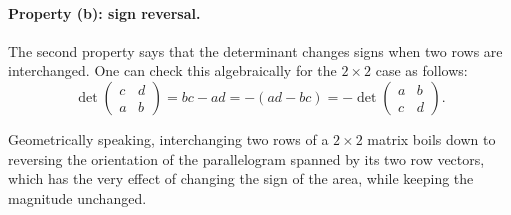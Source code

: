 \documentclass{ximera}
\begin{document}
\begin{image}[0.5\textwidth]
\end{image}


\paragraph{Property (b): sign reversal.}
The second property says that the determinant changes signs when two
rows are interchanged. One can check this algebraically for the
$2 \times 2$ case as follows:
\[
  \det
  \begin{pmatrix}
    c & d \\
    a & b
  \end{pmatrix}
  = bc - ad = -(ad - bc) =
  - \det
  \begin{pmatrix}
    a & b \\
    c & d
  \end{pmatrix}.
\]

Geometrically speaking, interchanging two rows of a $2 \times 2$ matrix
boils down to reversing the orientation of the parallelogram spanned
by its two row vectors, which has the very effect of changing the sign
of the area, while keeping the magnitude unchanged.
\end{document}
